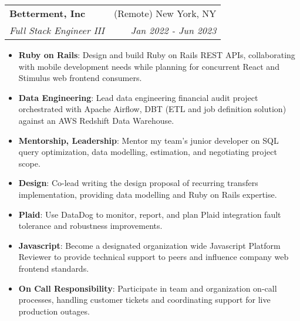 \documentclass[letterpaper,11pt]{article}
\makeatletter
\newcommand{\resumeItem}[2]{
  \item\small{
    \textbf{#1}{: #2 \vspace{-2pt}}
  }
}
\newcommand{\resumeSubheading}[4]{
  \vspace{-1pt}\item
    \begin{tabular*}{0.97\textwidth}{l@{\extracolsep{\fill}}r}
      \textbf{#1} & #2 \\
      \textit{\small#3} & \textit{\small #4} \\
    \end{tabular*}\vspace{-5pt}
}
\newcommand{\resumeItemListStart}{\begin{itemize}}
\newcommand{\resumeItemListEnd}{\end{itemize}\vspace{-5pt}}
\makeatother
\begin{document}
    \resumeSubheading
      {Betterment, Inc}{(Remote) New York, NY}
      {Full Stack Engineer III}{Jan 2022 - Jun 2023}
      \resumeItemListStart
        \resumeItem{Ruby on Rails}
          {Design and build Ruby on Rails REST APIs, collaborating with mobile development needs while planning for concurrent React and Stimulus web frontend consumers.}
        \resumeItem{Data Engineering}
          {Lead data engineering financial audit project orchestrated with Apache Airflow, DBT (ETL and job definition solution) against an AWS Redshift Data Warehouse.}
        \resumeItem{Mentorship, Leadership}
          {Mentor my team's junior developer on SQL query optimization, data modelling, estimation, and negotiating project scope.}
        \resumeItem{Design}
          {Co-lead writing the design proposal of recurring transfers implementation, providing data modelling and Ruby on Rails expertise.}
        \resumeItem{Plaid}
          {Use DataDog to monitor, report, and plan Plaid integration fault tolerance and robustness improvements.}
        \resumeItem{Javascript}
          {Become a designated organization wide Javascript Platform Reviewer to provide technical support to peers and influence company web frontend standards.}
        \resumeItem{On Call Responsibility}
          {Participate in team and organization on-call processes, handling customer tickets and coordinating support for live production outages.}
      \resumeItemListEnd
\end{document}
